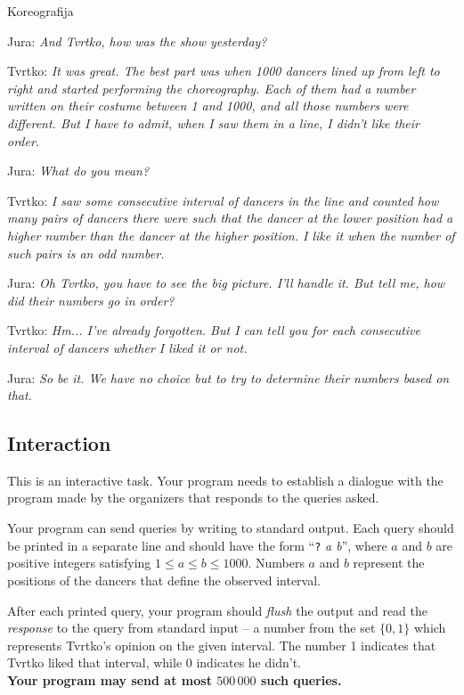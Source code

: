 \begin{statement}[
  problempoints=100,
  timelimit=8 seconds,
  memorylimit=1024 MiB,
]{Koreografija}

Jura: \textit{And Tvrtko, how was the show yesterday?}

Tvrtko: \textit{It was great. The best part was when 1000 dancers lined up
from left to right and started performing the choreography. Each of them had a number
written on their costume between 1 and 1000, and all those numbers were different.
But I have to admit, when I saw them in a line, I didn't like their order.}

Jura: \textit{What do you mean?}

Tvrtko: \textit{I saw some consecutive interval of dancers in the line and counted
how many pairs of dancers there were such that the dancer at the lower position had a higher number than the dancer at the higher position.
I like it when the number of such pairs is an odd number.}

Jura: \textit{Oh Tvrtko, you have to see the big picture. I'll handle it. But tell me, how did their numbers go in order?}

Tvrtko: \textit{Hm... I've already forgotten. But I can tell you for each consecutive interval of dancers whether I liked it or not.}

Jura: \textit{So be it. We have no choice but to try to determine their numbers based on that.}

\subsection*{Interaction}
This is an interactive task. Your program needs to establish a dialogue with the program
made by the organizers that responds to the queries asked.

Your program can send queries by writing to standard output. Each query should 
be printed in a separate line and should have the form 
``\texttt{?} \textit{a b}'', where $a$ and $b$  
are positive integers satisfying $1 \leq a \leq b \leq 1000$. Numbers 
$a$ and $b$ represent the positions of the dancers that define the observed interval. 

After each printed query, your program
should \textit{flush} the output and read the 
\textit{response} to the query from standard input -- a number from the set $\{0, 1\}$ which represents 
Tvrtko's opinion on the given interval. 
The number 1 indicates that Tvrtko liked that interval, while 0 indicates he didn't. \\
\textbf{Your program may send at most $500\,000$ such queries.}



\end{statement}
